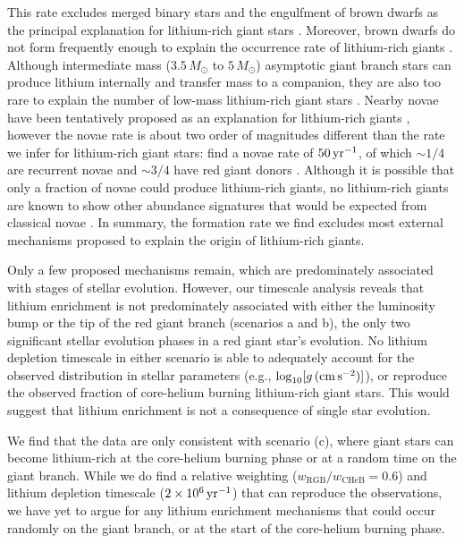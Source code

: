 \documentclass[twocolumn]{aastex62}
\newcommand{\logg}{\log_{10}[g\,({\rm cm\,s}^{-2})]}
\begin{document}
This rate excludes merged binary stars \citep[$0.01\,{\rm yr}^{-1}$;][]{Andrievsky_1999}
and the engulfment of brown dwarfs \citep{Siess_1999} as the principal explanation
for lithium-rich giant stars \citep{Politano_2010,Ivanova_2013}. 
Moreover, brown dwarfs do not form frequently enough to explain the occurrence rate of 
lithium-rich giants \citep{Cumming_2008}. Although intermediate mass 
($3.5\,M_\odot$ to $5\,M_\odot$) asymptotic giant branch stars can produce lithium
internally and transfer mass to a companion, they are also too rare to explain the number
of low-mass lithium-rich giant stars \citep{Karakas_2016}.
Nearby novae have been tentatively proposed as an explanation for lithium-rich giants \citep{Gratton_1989},  however the  novae rate is about two order of magnitudes different than the rate we infer for lithium-rich giant 
stars: \citet{Shafter_2017} find a novae rate of $50\,{\rm yr}^{-1}$, of which $\sim1/4$ are recurrent
novae and $\sim3/4$ have red giant donors \citep{Schaefer_2014}.
Although it is possible that only a fraction of novae could produce lithium-rich giants, 
no lithium-rich giants are known to show other abundance signatures that would be expected from classical novae \citep{Melo_2005}.
In summary, the formation rate we find excludes most 
external mechanisms proposed to explain the origin of lithium-rich giants.


Only a few proposed mechanisms remain, which are predominately associated with
stages of stellar evolution. However, our timescale analysis reveals that 
lithium enrichment is not predominately associated with either the luminosity
bump or the tip of the red giant branch (scenarios a and b), the only two
significant stellar evolution phases in a red giant star's evolution.
No lithium depletion timescale in either scenario is able to adequately account
for the observed distribution in stellar parameters (e.g., $\logg$), or reproduce
the observed fraction of core-helium burning lithium-rich giant stars.
This would suggest that lithium enrichment is not a consequence of single star evolution.


We find that the data are only consistent with scenario (c), where giant stars can become
lithium-rich at the core-helium burning phase or at a random time on the giant
branch. While we do find a relative weighting ($w_\mathrm{RGB}/w_\mathrm{CHeB} = 0.6$) and lithium
depletion timescale ($2\times10^6\,{\rm yr}^{-1}$) that can reproduce the
observations, we have yet to argue for any lithium enrichment mechanisms that 
could occur randomly on the giant branch, or at the start of the core-helium
burning phase.
\end{document}
